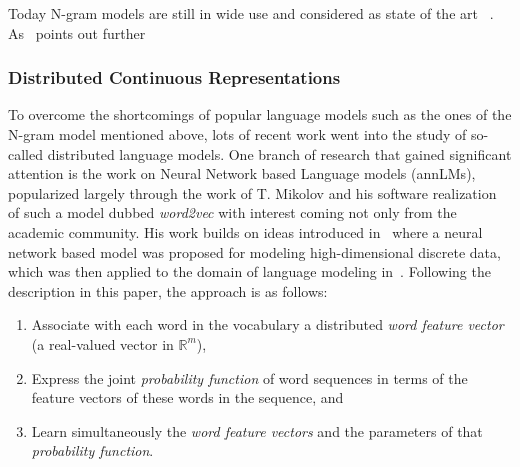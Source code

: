 Today N-gram models are still in wide use and considered as state of the art ~\cite[p.~17]{Mikolov:2012aa}. As~\cite{Mikolov:2012aa} points out further ~\cite[p.~17]{Mikolov:2012aa}

\subsubsection{Distributed Continuous Representations}
\label{subs:Distributed Continuous Representations}

To overcome the shortcomings of popular language models such as the ones of the N-gram model mentioned above, lots of recent work went into the study of so-called distributed language models. One branch of research that gained significant attention is the work on Neural Network based Language models (annLMs), popularized largely through the work of T. Mikolov and his software realization of such a model dubbed \emph{word2vec} with interest coming not only from the academic community. His work builds on ideas introduced in~\cite{Bengio:2000aa} where a neural network based model was proposed for modeling high-dimensional discrete data, which was then applied to the domain of language modeling in~\cite{bengio2003neural}. Following the description in this paper, the approach is as follows:

\begin{enumerate}
  \item Associate with each word in the vocabulary a distributed \emph{word feature vector} (a real-valued vector in $\mathbb{R}^m$),
  \item Express the joint \emph{probability function} of word sequences in terms of the feature vectors of these words in the sequence, and
  \item Learn simultaneously the \emph{word feature vectors} and the parameters of that \emph{probability function}.
\end{enumerate}

